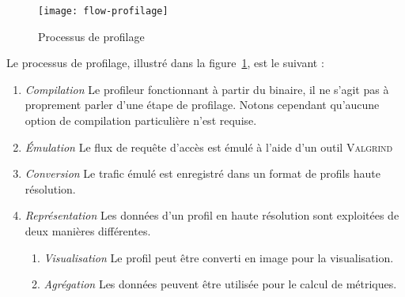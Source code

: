 
\begin{figure}[h!]
	\centering
	\texttt{[image: flow-profilage]}
	\caption{\label{fig:flow} Processus de profilage}
\end{figure}

Le processus de profilage, illustré dans la figure~\ref{fig:flow}, est le suivant :
\begin{enumerate}
	\item \emph{Compilation} Le profileur fonctionnant à partir du binaire, il ne s'agit pas à proprement parler d'une étape de profilage.
	Notons cependant qu'aucune option de compilation particulière n'est requise.
	\item \emph{Émulation} Le flux de requête d'accès est émulé à l'aide d'un outil \textsc{Valgrind}
	\item \emph{Conversion} Le trafic émulé est enregistré dans un format de profils haute résolution.
	\item \emph{Représentation} Les données d'un profil en haute résolution sont exploitées de deux manières différentes.
		\begin{enumerate}
			\item \emph{Visualisation} Le profil peut être converti en image pour la visualisation.
			\item \emph{Agrégation} Les données peuvent être utilisée pour le calcul de métriques.
		\end{enumerate}
\end{enumerate}

